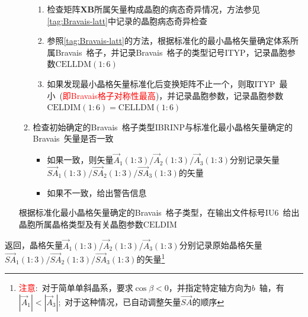 \documentclass{article}      %
\begin{document}
\begin{enumerate}
\begin{enumerate}
\begin{enumerate}
					\item 检查矩阵$\mathbf{XB}$所属矢量构成晶胞的病态奇异情况，方法参见\ref{tag:Bravais-latt}中记录的晶胞病态奇异检查
					\item 参照\ref{tag:Bravais-latt}的方法，根据标准化的最小晶格矢量确定体系所属\textrm{Bravais~}格子，并记录\textrm{Bravais~}格子的类型记号\textrm{ITYP}，记录晶胞参数$\mathrm{CELLDM}(1:6)$
					\item 如果发现最小晶格矢量标准化后变换矩阵不止一个，则取\textrm{ITYP}~最小~(\textcolor{red}{即\textrm{Bravais}格子对称性最高})，并记录晶胞参数，记录晶胞参数$\mathrm{CELDIM}(1:6)=\mathrm{CELLDM}(1:6)$
				\end{enumerate}
			\item 检查初始确定的\textrm{Bravais~}格子类型\textrm{IBRINP}与标准化最小晶格矢量确定的\textrm{Bravais~}矢量是否一致
				\begin{itemize}
					\item 如果一致，则矢量$\vec A_1(1:3)/\vec A_2(1:3)/\vec A_3(1:3)$分别记录矢量\\$\vec{SA}_1(1:3)/\vec{SA}_2(1:3)/\vec{SA}_3(1:3)$的矢量
					\item 如果不一致，给出警告信息
				\end{itemize}
				\end{enumerate}
				根据标准化最小晶格矢量确定的\textrm{Bravais~}格子类型，在输出文件标号\textrm{IU6}~给出晶胞所属晶格类型及有关晶胞参数$\mathrm{CELDIM}$
\end{enumerate}
返回，晶格矢量$\vec A_1(1:3)/\vec A_2(1:3)/\vec A_3(1:3)$分别记录原始晶格矢量\\$\vec{SA}_1(1:3)/\vec{SA}_2(1:3)/\vec{SA}_3(1:3)$的矢量\footnote{\textcolor{red}{注意}:~对于简单单斜晶系，要求$\cos\beta<0$，并指定特定轴方向为$b$~轴，有$|\vec A_1|<|\vec A_3|$;~对于这种情况，已自动调整矢量$\vec{SA}$的顺序}
\end{document}
